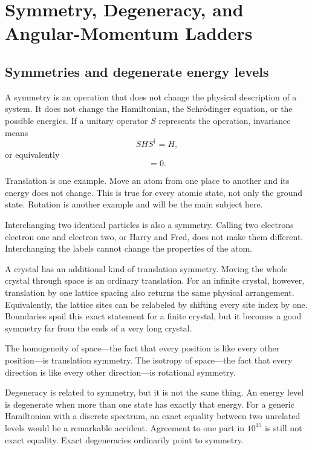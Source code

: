 \chapter{Symmetry, Degeneracy, and Angular-Momentum Ladders}
\providecommand{\ket}[1]{\left\lvert#1\right\rangle}

\section{Symmetries and degenerate energy levels}

A symmetry is an operation that does not change the physical description of a system. It does not change the Hamiltonian, the Schr\"odinger equation, or the possible energies. If a unitary operator \(S\) represents the operation, invariance means
\begin{equation}
S H S^\dagger=H,
\end{equation}
or equivalently
\begin{equation}
[S,H]=0.
\end{equation}

Translation is one example. Move an atom from one place to another and its energy does not change. This is true for every atomic state, not only the ground state. Rotation is another example and will be the main subject here.

Interchanging two identical particles is also a symmetry. Calling two electrons electron one and electron two, or Harry and Fred, does not make them different. Interchanging the labels cannot change the properties of the atom.

A crystal has an additional kind of translation symmetry. Moving the whole crystal through space is an ordinary translation. For an infinite crystal, however, translation by one lattice spacing also returns the same physical arrangement. Equivalently, the lattice sites can be relabeled by shifting every site index by one. Boundaries spoil this exact statement for a finite crystal, but it becomes a good symmetry far from the ends of a very long crystal.

The homogeneity of space---the fact that every position is like every other position---is translation symmetry. The isotropy of space---the fact that every direction is like every other direction---is rotational symmetry.

Degeneracy is related to symmetry, but it is not the same thing. An energy level is degenerate when more than one state has exactly that energy. For a generic Hamiltonian with a discrete spectrum, an exact equality between two unrelated levels would be a remarkable accident. Agreement to one part in \(10^{15}\) is still not exact equality. Exact degeneracies ordinarily point to symmetry.

